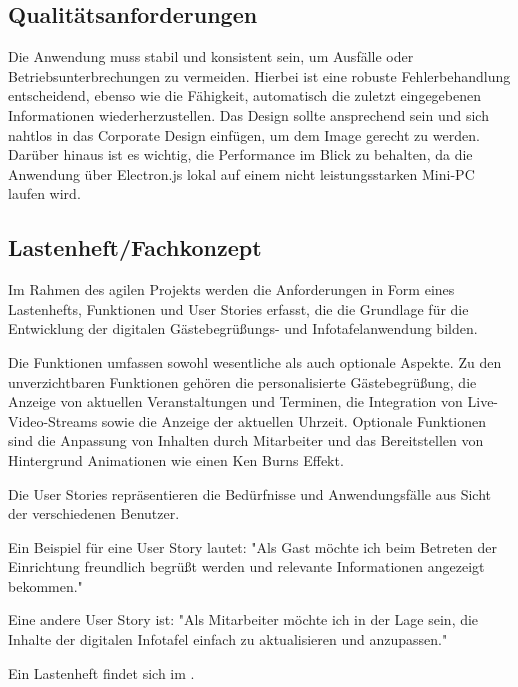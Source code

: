 \subsection{Qualitätsanforderungen}
\label{sec:Qualitaetsanforderungen}
Die Anwendung muss stabil und konsistent sein, um Ausfälle oder Betriebsunterbrechungen zu vermeiden.
Hierbei ist eine robuste Fehlerbehandlung entscheidend, ebenso wie die Fähigkeit, automatisch die zuletzt eingegebenen Informationen wiederherzustellen.
Das Design sollte ansprechend sein und sich nahtlos in das Corporate Design einfügen, um dem Image gerecht zu werden.
Darüber hinaus ist es wichtig, die Performance im Blick zu behalten, da die Anwendung über Electron.js lokal auf einem nicht leistungsstarken Mini-PC laufen wird.


\subsection{Lastenheft/Fachkonzept}
\label{sec:Lastenheft}
Im Rahmen des agilen Projekts werden die Anforderungen in Form eines Lastenhefts, Funktionen und User Stories erfasst, die die Grundlage für die Entwicklung der digitalen Gästebegrüßungs- und Infotafelanwendung bilden.


Die Funktionen umfassen sowohl wesentliche als auch optionale Aspekte.
Zu den unverzichtbaren Funktionen gehören die personalisierte Gästebegrüßung, die Anzeige von aktuellen Veranstaltungen und Terminen, die Integration von Live-Video-Streams sowie die Anzeige der aktuellen Uhrzeit.
Optionale Funktionen sind die Anpassung von Inhalten durch Mitarbeiter und das Bereitstellen von Hintergrund Animationen wie \zB einen Ken Burns Effekt.


Die User Stories repräsentieren die Bedürfnisse und Anwendungsfälle aus Sicht der verschiedenen Benutzer.

Ein Beispiel für eine User Story lautet: "Als Gast möchte ich beim Betreten der Einrichtung freundlich begrüßt werden und relevante Informationen angezeigt bekommen."

Eine andere User Story ist: "Als Mitarbeiter möchte ich in der Lage sein, die Inhalte der digitalen Infotafel einfach zu aktualisieren und anzupassen."


Ein Lastenheft findet sich im .
